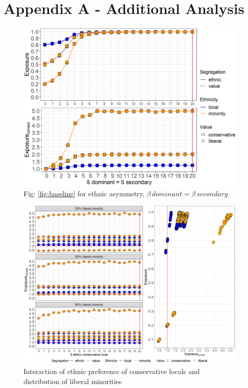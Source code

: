 \documentclass{article}
\begin{document}
\section*{Appendix A - Additional Analysis}


\begin{figure}[H]
    \centering
    \includegraphics[scale=0.5]{material/figures/asym_all.jpg}
    \caption{Fig: \ref{fig:baseline} for ethnic asymmetry, $\beta \,dominant = \beta \,secondary$}
    \label{fig:etcnlc}
\end{figure} %


\begin{figure}[H]
    \centering
    \includegraphics[scale=0.5]{material/figures/etcnlc.jpg}
    \caption{Interaction of ethnic preference of conservative locals and distribution of liberal minorities}
    \label{fig:etcnlc}
\end{figure} %
\end{document}
